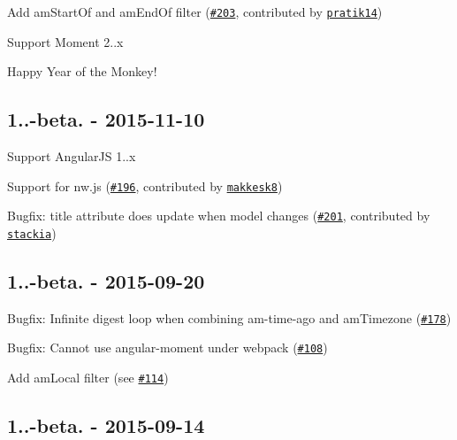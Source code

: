 \begin{DoxyItemize}
\item Add am\+Start\+Of and am\+End\+Of filter (\href{https://github.com/urish/angular-moment/pull/203}{\tt \#203}, contributed by \href{https://github.com/pratik14}{\tt pratik14})
\item Support Moment 2..\+x
\item Happy Year of the Monkey!
\end{DoxyItemize}

\subsection*{1..-\/beta. -\/ 2015-\/11-\/10}


\begin{DoxyItemize}
\item Support Angular\+JS 1..\+x
\item Support for nw.\+js (\href{https://github.com/urish/angular-moment/pull/196}{\tt \#196}, contributed by \href{https://github.com/makkesk8}{\tt makkesk8})
\item Bugfix\+: {\ttfamily title} attribute does update when model changes (\href{https://github.com/urish/angular-moment/pull/201}{\tt \#201}, contributed by \href{https://github.com/stackia}{\tt stackia})
\end{DoxyItemize}

\subsection*{1..-\/beta. -\/ 2015-\/09-\/20}


\begin{DoxyItemize}
\item Bugfix\+: Infinite digest loop when combining {\ttfamily am-\/time-\/ago} and {\ttfamily am\+Timezone} (\href{https://github.com/urish/angular-moment/issues/178}{\tt \#178})
\item Bugfix\+: Cannot use angular-\/moment under webpack (\href{https://github.com/urish/angular-moment/issues/108}{\tt \#108})
\item Add {\ttfamily am\+Local} filter (see \href{https://github.com/urish/angular-moment/issues/114}{\tt \#114})
\end{DoxyItemize}

\subsection*{1..-\/beta. -\/ 2015-\/09-\/14}

